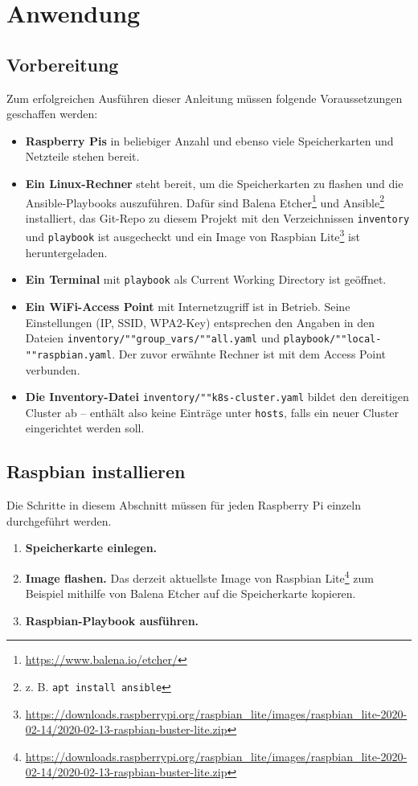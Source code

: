 \chapter{Anwendung}
\section{Vorbereitung}
Zum erfolgreichen Ausführen dieser Anleitung müssen folgende Voraussetzungen geschaffen werden:

\begin{itemize}
    \item \textbf{Raspberry Pis} in beliebiger Anzahl und ebenso viele Speicherkarten und Netzteile stehen bereit.
    \item \textbf{Ein Linux-Rechner} steht bereit, um die Speicherkarten zu flashen und die Ansible-Playbooks auszuführen. Dafür sind Balena Etcher\footnote{\url{https://www.balena.io/etcher/}} und Ansible\footnote{z. B. \texttt{apt install ansible}} installiert, das Git-Repo zu diesem Projekt mit den Verzeichnissen \texttt{inventory} und \texttt{playbook} ist ausgecheckt und ein Image von Raspbian Lite\footnote{\url{https://downloads.raspberrypi.org/raspbian_lite/images/raspbian_lite-2020-02-14/2020-02-13-raspbian-buster-lite.zip}} ist heruntergeladen.
    \item \textbf{Ein Terminal} mit \texttt{playbook} als Current Working Directory ist geöffnet.
    \item \textbf{Ein WiFi-Access Point} mit Internetzugriff ist in Betrieb. Seine Einstellungen (IP, SSID, WPA2-Key) entsprechen den Angaben in den Dateien \texttt{inventory/""group\_vars/""all.yaml} und \texttt{playbook/""local-""raspbian.yaml}. Der zuvor erwähnte Rechner ist mit dem Access Point verbunden.
    \item \textbf{Die Inventory-Datei} \texttt{inventory/""k8s-cluster.yaml} bildet den dereitigen Cluster ab -- enthält also keine Einträge unter \texttt{hosts}, falls ein neuer Cluster eingerichtet werden soll.
\end{itemize}

\section{Raspbian installieren}
Die Schritte in diesem Abschnitt müssen für jeden Raspberry Pi einzeln durchgeführt werden.

\begin{enumerate}
    \item \textbf{Speicherkarte einlegen.}
    \item \textbf{Image flashen.} Das derzeit aktuellste Image von Raspbian Lite\footnote{\url{https://downloads.raspberrypi.org/raspbian_lite/images/raspbian_lite-2020-02-14/2020-02-13-raspbian-buster-lite.zip}} zum Beispiel mithilfe von Balena Etcher auf die Speicherkarte kopieren.
    \item \textbf{Raspbian-Playbook ausführen.}
\end{enumerate}

